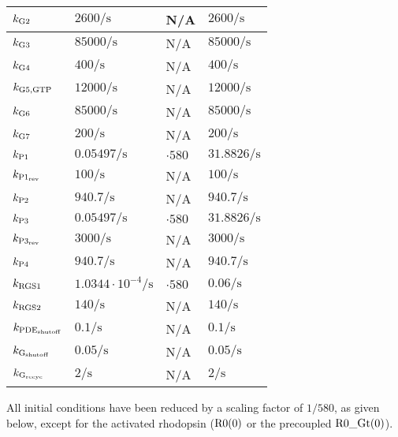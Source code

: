 \documentclass[a4paper, 12pt]{book}
\begin{document}
\begin{table}[H]
\begin{tabular}{l | l | l | l}
\hline
\textcolor{red}{$k_{\rm G2}$} & $2600/\mathrm{s}$ & N/A & $2600/\mathrm{s}$\\
\hline
\textcolor{red}{$k_{\rm G3}$} & $85000/\mathrm{s}$ & N/A & $85000/\mathrm{s}$\\
\hline
$k_{\rm G4}$ & $400/\mathrm{s}$ & N/A & $400/\mathrm{s}$\\
\hline
\textcolor{red}{$k_{\rm G5,GTP}$} & $ 12000/\mathrm{s}$ & N/A & $ 12000/\mathrm{s}$\\
\hline
\textcolor{red}{$k_{\rm G6}$} & $ 85000/\mathrm{s}$ & N/A &  $ 85000/\mathrm{s}$\\
\hline
$k_{\rm G7}$ & $ 200/\mathrm{s}$ & N/A & $200/\mathrm{s}$\\
\hline
$k_{\rm P1}$ & $0.05497/\mathrm{s}$ & $\cdot 580$ & $ 31.8826/\mathrm{s}$ \\
\hline
\textcolor{red}{$k_{\rm P1_{rev}}$} & $ 100/\mathrm{s}$ & N/A & $ 100/\mathrm{s}$\\
\hline
$k_{\rm P2}$ & $ 940.7/\mathrm{s}$ & N/A & $ 940.7/\mathrm{s}$\\
\hline
\textcolor{red}{$k_{\rm P3}$} & $ 0.05497/\mathrm{s}$ & $\cdot 580$ & $31.8826/\mathrm{s}$ \\
\hline
\textcolor{red}{$k_{\rm P3_{rev}}$} & $ 3000/\mathrm{s}$ & N/A & $ 3000/\mathrm{s}$\\
\hline
\textcolor{red}{$k_{\rm P4}$} & $ 940.7/\mathrm{s}$ & N/A & $ 940.7/\mathrm{s}$ \\
\hline
\textcolor{red}{$k_{\rm RGS1}$} & $ 1.0344 \cdot 10^{-4}/\mathrm{s}$ & $\cdot 580$ & $0.06/\mathrm{s}$ \\
\hline
\textcolor{red}{$k_{\rm RGS2}$} & $ 140/\mathrm{s}$ & N/A & $ 140/\mathrm{s}$ \\
\hline
$k_{\rm PDE_{shutoff}}$ & $ 0.1/\mathrm{s}$ & N/A &  $ 0.1/\mathrm{s}$\\
\hline
$k_{\rm G_{shutoff}}$ & $ 0.05/\mathrm{s}$ & N/A & $ 0.05/\mathrm{s}$ \\
\hline
$k_{\rm G_{recyc}}$ & $ 2/\mathrm{s}$ & N/A & $ 2/\mathrm{s}$\\
\hline
\end{tabular}
\end{table}

\newpage

All initial conditions have been reduced by a scaling factor of $1/580$, as given below, except for the activated rhodopsin (${\rm R0}(0)$ or the precoupled ${\rm R0}\_{\rm Gt}(0)$).
\end{document}
